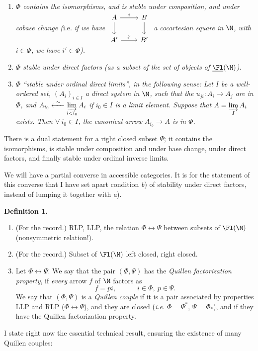 \begin{enumerate}[label={}]
\item[a)] \textit{$\Phi$ contains the isomorphisms, and is stable under composition, and under cobase change (}i.e. \textit{if we have}
$\vcenter{\hbox{\begin{tikzcd}
A \arrow[r, "i"] \arrow[d] & B \arrow[d] \\
A' \arrow[r, "i'"] & B'
\end{tikzcd}}}$
\textit{a cocartesian square in $\M$, with $i \in \Phi$, we have $i' \in \Phi$).}

\item[b)] \textit{$\Phi$ stable under direct factors (as a subset of the set of objects of} $\underline{\Fl}(\M)$\textit{).}

\item[c)] \textit{$\Phi$ ``stable under ordinal direct limits'', in the following sense: Let $I$ be a well-ordered set, $(A_i)_{i \in I}$ a direct system in $\M$, such that the $u_{ji} : A_i \longrightarrow A_j$ are in $\Phi$, and $A_{i_0} \xleftarrow{\ \sim\ } \varinjlim\limits_{i<i_0} A_i$ if $i_0 \in I$ is a limit element. Suppose that $A = \varinjlim\limits_{I} A_i$ exists. Then $\forall\ i_0 \in I$, the canonical arrow $A_{i_0} \longrightarrow A$ is in $\Phi$.}
\end{enumerate}

There is a dual statement for a right closed subset $\Psi$; it contains the isomorphisms, is stable under composition and under base change, under direct factors, and finally stable under ordinal inverse limits.


We will have a partial converse in accessible categories. It is for the statement of this converse that I have set apart condition \textit{b}) of stability under direct factors, instead of lumping it together with \textit{a}).

\noindent\textbf{Definition 1.}

\begin{enumerate}[label={}]
\item[\textit{a})] (For the record.) RLP, LLP, the relation $\Phi \longleftrightarrow \Psi$ between subsets of $\Fl(\M)$ (nonsymmetric relation!).

\item[\textit{b})] (For the record.) Subset of $\Fl(\M)$ left closed, right closed.

\item[\textit{c})] Let $\Phi \longleftrightarrow \Psi$. We say that the pair $(\Phi, \Psi)$ has the \textit{Quillen factorization property}, if \textit{every} arrow $f$ of $\M$ factors as
\[
f = pi, \qquad\quad i \in \Phi,\ p \in \Psi.
\]
We say that $(\Phi, \Psi)$ is a \textit{Quillen couple} if it is a pair associated by properties LLP and RLP ($\Phi \longleftrightarrow \Psi$), and they are closed (\textit{i.e.} $\Phi = \Psi^*$, $\Psi = \Phi_*$), and if they have the Quillen factorization property.
\end{enumerate}

I state right now the essential technical result, ensuring the existence of many Quillen couples: